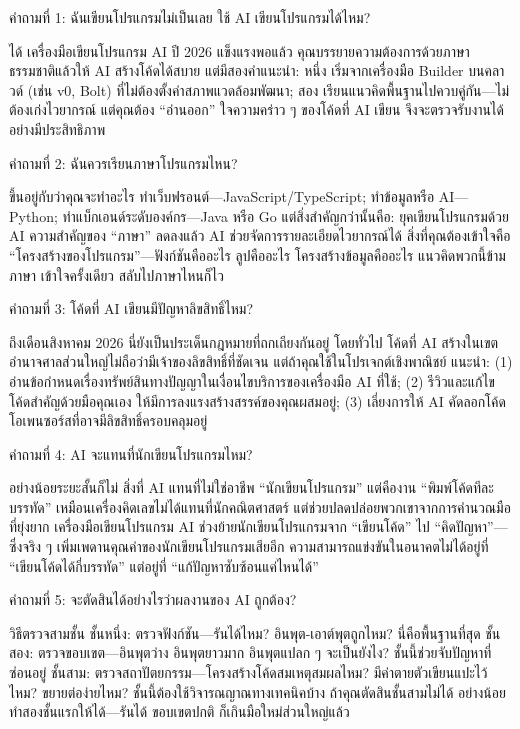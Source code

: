 
คำถามที่ 1: ฉันเขียนโปรแกรมไม่เป็นเลย ใช้ AI เขียนโปรแกรมได้ไหม?

ได้ เครื่องมือเขียนโปรแกรม AI ปี 2026 แข็งแรงพอแล้ว คุณบรรยายความต้องการด้วยภาษาธรรมชาติแล้วให้ AI สร้างโค้ดได้สบาย แต่มีสองคำแนะนำ: หนึ่ง เริ่มจากเครื่องมือ Builder บนคลาวด์ (เช่น v0, Bolt) ที่ไม่ต้องตั้งค่าสภาพแวดล้อมพัฒนา; สอง เรียนแนวคิดพื้นฐานไปควบคู่กัน—ไม่ต้องเก่งไวยากรณ์ แต่คุณต้อง “อ่านออก” ใจความคร่าว ๆ ของโค้ดที่ AI เขียน จึงจะตรวจรับงานได้อย่างมีประสิทธิภาพ

คำถามที่ 2: ฉันควรเรียนภาษาโปรแกรมไหน?

ขึ้นอยู่กับว่าคุณจะทำอะไร ทำเว็บฟรอนต์—JavaScript/TypeScript; ทำข้อมูลหรือ AI—Python; ทำแบ็กเอนด์ระดับองค์กร—Java หรือ Go แต่สิ่งสำคัญกว่านั้นคือ: ยุคเขียนโปรแกรมด้วย AI ความสำคัญของ “ภาษา” ลดลงแล้ว AI ช่วยจัดการรายละเอียดไวยากรณ์ได้ สิ่งที่คุณต้องเข้าใจคือ “โครงสร้างของโปรแกรม”—ฟังก์ชันคืออะไร ลูปคืออะไร โครงสร้างข้อมูลคืออะไร แนวคิดพวกนี้ข้ามภาษา เข้าใจครั้งเดียว สลับไปภาษาไหนก็ไว

คำถามที่ 3: โค้ดที่ AI เขียนมีปัญหาลิขสิทธิ์ไหม?

ถึงเดือนสิงหาคม 2026 นี่ยังเป็นประเด็นกฎหมายที่ถกเถียงกันอยู่ โดยทั่วไป โค้ดที่ AI สร้างในเขตอำนาจศาลส่วนใหญ่ไม่ถือว่ามีเจ้าของลิขสิทธิ์ที่ชัดเจน แต่ถ้าคุณใช้ในโปรเจกต์เชิงพาณิชย์ แนะนำ: (1) อ่านข้อกำหนดเรื่องทรัพย์สินทางปัญญาในเงื่อนไขบริการของเครื่องมือ AI ที่ใช้; (2) รีวิวและแก้ไขโค้ดสำคัญด้วยมือคุณเอง ให้มีการลงแรงสร้างสรรค์ของคุณผสมอยู่; (3) เลี่ยงการให้ AI คัดลอกโค้ดโอเพนซอร์สที่อาจมีลิขสิทธิ์ครอบคลุมอยู่

คำถามที่ 4: AI จะแทนที่นักเขียนโปรแกรมไหม?

อย่างน้อยระยะสั้นก็ไม่ สิ่งที่ AI แทนที่ไม่ใช่อาชีพ “นักเขียนโปรแกรม” แต่คืองาน “พิมพ์โค้ดทีละบรรทัด” เหมือนเครื่องคิดเลขไม่ได้แทนที่นักคณิตศาสตร์ แต่ช่วยปลดปล่อยพวกเขาจากการคำนวณมือที่ยุ่งยาก เครื่องมือเขียนโปรแกรม AI ช่วงย้ายนักเขียนโปรแกรมจาก “เขียนโค้ด” ไป “คิดปัญหา”—ซึ่งจริง ๆ เพิ่มเพดานคุณค่าของนักเขียนโปรแกรมเสียอีก ความสามารถแข่งขันในอนาคตไม่ได้อยู่ที่ “เขียนโค้ดได้กี่บรรทัด” แต่อยู่ที่ “แก้ปัญหาซับซ้อนแค่ไหนได้”

คำถามที่ 5: จะตัดสินได้อย่างไรว่าผลงานของ AI ถูกต้อง?

วิธีตรวจสามชั้น ชั้นหนึ่ง: ตรวจฟังก์ชัน—รันได้ไหม? อินพุต-เอาต์พุตถูกไหม? นี่คือพื้นฐานที่สุด ชั้นสอง: ตรวจขอบเขต—อินพุตว่าง อินพุตยาวมาก อินพุตแปลก ๆ จะเป็นยังไง? ชั้นนี้ช่วยจับปัญหาที่ซ่อนอยู่ ชั้นสาม: ตรวจสถาปัตยกรรม—โครงสร้างโค้ดสมเหตุสมผลไหม? มีค่าตายตัวเขียนแปะไว้ไหม? ขยายต่อง่ายไหม? ชั้นนี้ต้องใช้วิจารณญาณทางเทคนิคบ้าง ถ้าคุณตัดสินชั้นสามไม่ได้ อย่างน้อยทำสองชั้นแรกให้ได้—รันได้ ขอบเขตปกติ ก็เกินมือใหม่ส่วนใหญ่แล้ว

